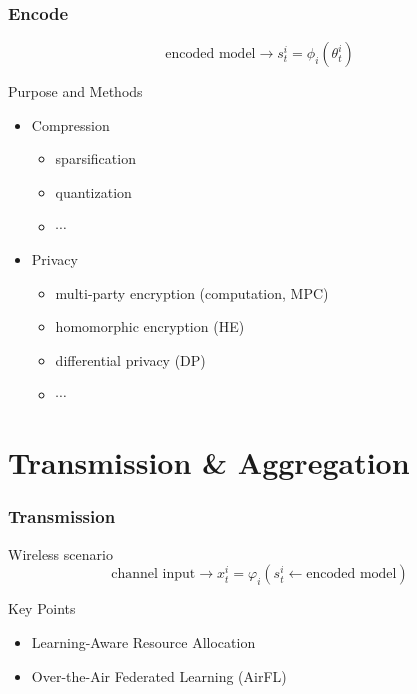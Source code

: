 \begin{frame}
\frametitle{Encode}

$$\text{encoded model} \to s_t^i = \phi_i(\theta_t^i)$$

\begin{block}{Purpose and Methods}
\begin{itemize}
\item Compression
  \begin{itemize}
      \item sparsification
      \item quantization
      \item $\cdots$
  \end{itemize}
\item Privacy
  \begin{itemize}
      \item multi-party encryption (computation, MPC)
      \item homomorphic encryption (HE)
      \item differential privacy (DP)
      \item $\cdots$
  \end{itemize}
\end{itemize}
\end{block}

\end{frame}


\section{Transmission \& Aggregation}


\begin{frame}
\frametitle{Transmission}

{\color{red} Wireless scenario}
$$\text{channel input} \rightarrow x_t^i = \varphi_i(s_t^i \leftarrow \text{encoded model})$$

\vspace{1em}

\begin{block}{Key Points}
\begin{itemize}
\item Learning-Aware Resource Allocation
\item Over-the-Air Federated Learning (AirFL)
\end{itemize}
\end{block}

\end{frame}

